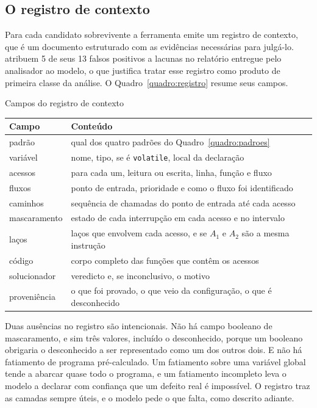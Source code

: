 \subsection{O registro de contexto}

Para cada candidato sobrevivente a ferramenta emite um registro de contexto,
que é um documento estruturado com as evidências necessárias para julgá-lo.
 atribuem 5 de seus 13 falsos positivos a lacunas no
relatório entregue pelo analisador ao modelo, o que justifica tratar esse
registro como produto de primeira classe da análise. O
Quadro~\ref{quadro:registro} resume seus campos.

\begin{quadro}[htb]
  \caption{\label{quadro:registro}Campos do registro de contexto}
  \begin{tabular}{|l|L{10.4cm}|}
    \hline
    Campo & Conteúdo \\
    \hline
    padrão & qual dos quatro padrões do Quadro~\ref{quadro:padroes} \\
    \hline
    variável & nome, tipo, se é \texttt{volatile}, local da declaração \\
    \hline
    acessos & para cada um, leitura ou escrita, linha, função e fluxo \\
    \hline
    fluxos & ponto de entrada, prioridade e como o fluxo foi identificado \\
    \hline
    caminhos & sequência de chamadas do ponto de entrada até cada acesso \\
    \hline
    mascaramento & estado de cada interrupção em cada acesso e no intervalo \\
    \hline
    laços & laços que envolvem cada acesso, e se $A_1$ e $A_2$ são a mesma instrução \\
    \hline
    código & corpo completo das funções que contêm os acessos \\
    \hline
    solucionador & veredicto e, se inconclusivo, o motivo \\
    \hline
    proveniência & o que foi provado, o que veio da configuração, o que é desconhecido \\
    \hline
  \end{tabular}
\end{quadro}

Duas ausências no registro são intencionais. Não há campo booleano de
mascaramento, e sim três valores, incluído o desconhecido, porque um booleano
obrigaria o desconhecido a ser representado como um dos outros dois. E não há fatiamento de programa
pré-calculado. Um fatiamento sobre uma variável global tende a abarcar quase
todo o programa, e um fatiamento incompleto leva o modelo a declarar com
confiança que um defeito real é impossível. O registro traz as camadas sempre
úteis, e o modelo pede o que falta, como descrito adiante.

